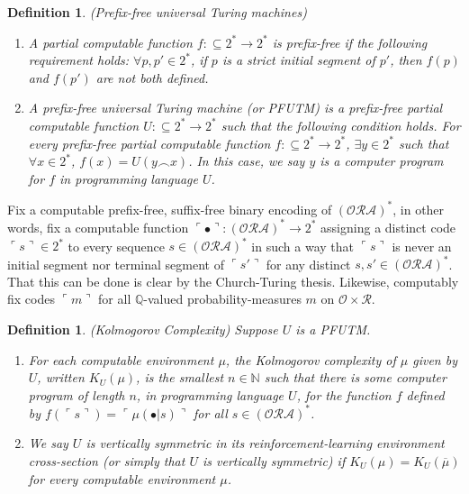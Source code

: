 \documentclass{article}
\newtheorem{definition}[theorem]{Definition}
\begin{document}
\begin{definition}
    (Prefix-free universal Turing machines)
    \begin{enumerate}
        \item A partial computable function $f:\subseteq 2^*\to 2^*$
        is \emph{prefix-free} if the following requirement holds:
        $\forall p,p'\in 2^*$, if $p$ is a strict initial segment of $p'$,
        then $f(p)$ and $f(p')$ are not both defined.
        \item A \emph{prefix-free universal Turing machine}
        (or \emph{PFUTM}) is a prefix-free
        partial computable function $U:\subseteq 2^*\to 2^*$
        such that the following condition holds.
        For every prefix-free partial computable function
        $f:\subseteq 2^*\to 2^*$, $\exists y\in 2^*$ such that
        $\forall x\in 2^*$, $f(x)=U(y\frown x)$.
        In this case, we say $y$ is a \emph{computer program for
        $f$ in programming language $U$}.
    \end{enumerate}
\end{definition}

Fix a computable prefix-free, suffix-free binary encoding of
$(\mathcal O \mathcal R\mathcal A)^*$, in other words,
fix a computable function
$\ulcorner\bullet\urcorner:(\mathcal O \mathcal R\mathcal A)^*\to 2^*$
assigning a distinct code $\ulcorner s\urcorner\in 2^*$ to every sequence
$s\in (\mathcal O \mathcal R\mathcal A)^*$ in such a way that
$\ulcorner s\urcorner$ is never an initial segment nor terminal segment
of $\ulcorner s'\urcorner$
for any distinct $s,s'\in (\mathcal O \mathcal R\mathcal A)^*$.
That this can be done is clear by the Church-Turing thesis.
Likewise, computably fix codes $\ulcorner m\urcorner$ for all
$\mathbb Q$-valued probability-measures $m$ on $\mathcal O\times\mathcal R$.

\begin{definition}
(Kolmogorov Complexity)
Suppose $U$ is a PFUTM.
\begin{enumerate}
    \item
    For each computable environment $\mu$, the \emph{Kolmogorov complexity of $\mu$
    given by $U$}, written $K_U(\mu)$, is the smallest $n\in\mathbb N$ such that
    there is some computer program of length $n$, in programming language $U$,
    for the function
    $f$
    defined by
    $f(\ulcorner s\urcorner)=\ulcorner \mu(\bullet|s)\urcorner$
    for all $s\in (\mathcal O \mathcal R\mathcal A)^*$.
    \item
    We say $U$ is \emph{vertically symmetric in its reinforcement-learning
    environment
    cross-section} (or simply that $U$ is \emph{vertically symmetric}) if
    $K_U(\mu)=K_U(\overline\mu)$ for every computable environment $\mu$.
\end{enumerate}
\end{definition}
\end{document}
